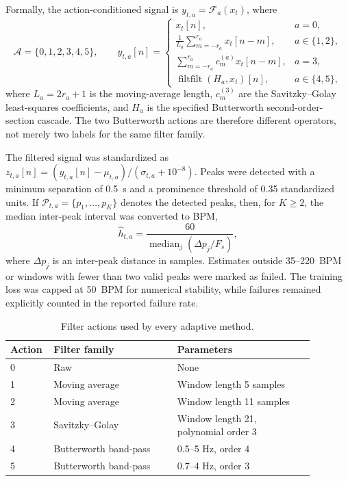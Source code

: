 \documentclass{elektr}
\begin{document}
Formally, the action-conditioned signal is $y_{t,a}=\mathcal{F}_a(x_t)$, where
\begin{equation}
 \mathcal{A}=\{0,1,2,3,4,5\},\qquad
 y_{t,a}[n]=
 \begin{cases}
 x_t[n], & a=0,\\[1mm]
 \displaystyle\frac{1}{L_a}\sum_{m=-r_a}^{r_a}x_t[n-m], & a\in\{1,2\},\\[3mm]
 \displaystyle\sum_{m=-r_a}^{r_a}c^{(a)}_m x_t[n-m], & a=3,\\[2mm]
 \operatorname{filtfilt}\!\left(H_a,x_t\right)[n], & a\in\{4,5\},
 \end{cases}
 \label{eq:actionfilter}
\end{equation}
where $L_a=2r_a+1$ is the moving-average length, $c^{(3)}_m$ are the Savitzky--Golay least-squares coefficients, and $H_a$ is the specified Butterworth second-order-section cascade. The two Butterworth actions are therefore different operators, not merely two labels for the same filter family.

The filtered signal was standardized as $z_{t,a}[n]=(y_{t,a}[n]-\mu_{t,a})/(\sigma_{t,a}+10^{-8})$. Peaks were detected with a minimum separation of 0.5~s and a prominence threshold of 0.35 standardized units. If $\mathcal{P}_{t,a}=\{p_1,\ldots,p_K\}$ denotes the detected peaks, then, for $K\geq2$, the median inter-peak interval was converted to BPM,
\begin{equation}
    \widehat{h}_{t,a}=\frac{60}{\operatorname{median}_{j}(\Delta p_j/F_s)},
    \label{eq:hr}
\end{equation}
where $\Delta p_j$ is an inter-peak distance in samples. Estimates outside 35--220~BPM or windows with fewer than two valid peaks were marked as failed. The training loss was capped at 50~BPM for numerical stability, while failures remained explicitly counted in the reported failure rate.

\begin{table}[h!]
\caption{Filter actions used by every adaptive method.}
\label{tab:actions}
\begin{center}
\small
\begin{tabular}{p{0.08\linewidth}p{0.38\linewidth}p{0.42\linewidth}}
\toprule
Action & Filter family & Parameters \\
\midrule
0 & Raw & None \\
1 & Moving average & Window length 5 samples \\
2 & Moving average & Window length 11 samples \\
3 & Savitzky--Golay & Window length 21, polynomial order 3 \\
4 & Butterworth band-pass & 0.5--5 Hz, order 4 \\
5 & Butterworth band-pass & 0.7--4 Hz, order 3 \\
\bottomrule
\end{tabular}
\end{center}
\vs{-4mm}
\end{table}
\end{document}
